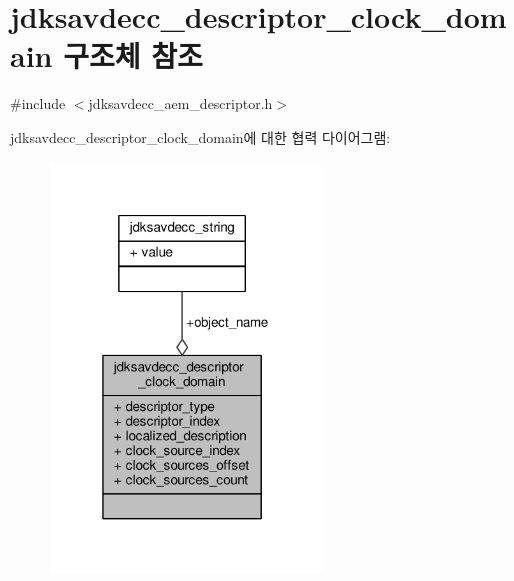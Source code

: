 \hypertarget{structjdksavdecc__descriptor__clock__domain}{}\section{jdksavdecc\+\_\+descriptor\+\_\+clock\+\_\+domain 구조체 참조}
\label{structjdksavdecc__descriptor__clock__domain}


{\ttfamily \#include $<$jdksavdecc\+\_\+aem\+\_\+descriptor.\+h$>$}



jdksavdecc\+\_\+descriptor\+\_\+clock\+\_\+domain에 대한 협력 다이어그램\+:
\nopagebreak
\begin{figure}[H]
\begin{center}
\leavevmode
\includegraphics[width=205pt]{structjdksavdecc__descriptor__clock__domain__coll__graph}
\end{center}
\end{figure}
